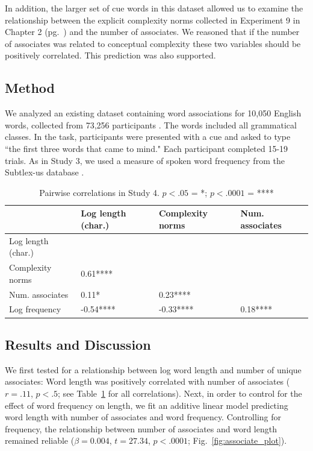 In addition, the larger set of cue words in this dataset allowed us to  examine the relationship between the explicit complexity norms collected in  Experiment 9 in Chapter 2 (pg.\ \pageref{ch2-9}) and the number of associates. We reasoned that if the number of associates was related to conceptual complexity these two variables should be positively correlated. This prediction was also supported.

\subsection{Method}
We analyzed an existing dataset containing word associations for  10,050 English words, collected from 73,256 participants \cite{de2013better}. The words included all grammatical classes. In the task, participants were presented with a cue and  asked to type ``the first  three words that came to mind." Each participant completed 15-19 trials. As in Study 3, we used a measure of spoken word frequency from the Subtlex-us database \cite{brysbaert2009moving}. 


\begin{table}[t!]
\centering
\begin{tabular}{llll}
  \hline
 & Log length (char.)  & Complexity norms &   Num. associates  \\ 
  \hline
Log length (char.) &  &  &  \\ 
Complexity norms  &  0.61**** &  &  \\ 
Num. associates &  0.11*    &  0.23**** &  \\ 
Log frequency& -0.54**** & -0.33**** &  0.18**** \\ 
   \hline
\end{tabular}
\caption{Pairwise correlations in Study 4. $p<.05$ = *; $p<.0001$ = ****}
\label{study4corr}
\end{table}

\subsection{Results and Discussion}

We first tested for a relationship between log word length and number of unique associates: Word length was positively correlated with number of associates ($r = .11$, $p< .5$; see Table~\ref{study4corr} for all correlations).  Next, in order to control for the effect of word frequency on length, we fit an additive linear model predicting word length with number of associates and word frequency. Controlling for frequency, the relationship between number of associates and word length remained reliable ($\beta=0.004$, $t =27.34$, $p<.0001$; Fig.\ \ref{fig:associate_plot}).

